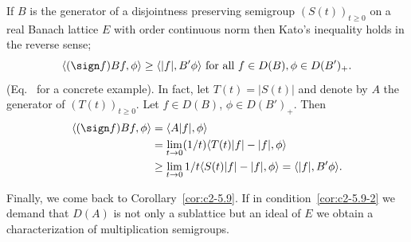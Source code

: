 \begin{remark}\label{rem:c2-5.12}
%
If\/ $B$ is the generator of a disjointness preserving semigroup $(S(t))_{t \geq 0}$ on a real Banach lattice $E$ with order continuous norm then Kato's inequality holds in the reverse sense; \ie
\[
\langle(\sign  f)Bf,\phi \rangle \geq \langle |f|, B'\phi \rangle \text{ for all } f \in D(B), \phi \in D(B')_{+}.
\]
(\cf Eq.~ for a concrete example). 
In fact, let $T(t) = |S(t)|$ and denote by $A$ the generator of\/ $(T(t))_{t \geq 0}$. 
Let $f \in D(B)$, $\phi \in D(B')_{+}$.
Then 
\begin{align*}
\langle(\sign  f)Bf,\phi \rangle &= \langle A|f|,\phi \rangle \\
 &= \lim_{t \to 0} (1/t) \langle T(t)|f| - |f|, \phi \rangle \\
 &\geq \lim_{t \to 0} 1/t \langle S(t)|f| - |f|, \phi \rangle 
 = \langle |f|, B'\phi \rangle.
\end{align*}
\end{remark}
Finally, we come back to Corollary~\ref{cor:c2-5.9}.
If in condition~\ref{cor:c2-5.9-2}   we demand that $D(A)$ is not only a sublattice but an ideal of\/ $E$ we obtain a characterization of multiplication semigroups.

